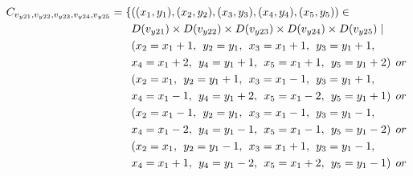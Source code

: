 \begin{align*}
\Cons{y21}{y22}{y23}{y24}{y25}=\{&((x_{1},y_{1}),(x_{2},y_{2}),(x_{3},y_{3}),(x_{4},y_{4}),(x_{5},y_{5}))\in \\
&\Domain {y21} \times \Domain{y22}\times \Domain{y23}\times \Domain{y24}\times \Domain{y25} \mid\\
&(x_{2} = x_{1} + 1,\hspace{1ex}y_{2} = y_{1},\hspace{1ex}x_{3} = x_{1}+1,\hspace{1ex}y_{3} = y_{1}+1,
\\&x_{4} = x_{1}+2,\hspace{1ex}y_{4} = y_{1}+1,\hspace{1ex}x_{5} = x_{1}+1,\hspace{1ex}y_{5} = y_{1}+2)\hspace{1ex} or \\
&(x_{2} = x_{1} ,\hspace{1ex}y_{2} = y_{1}+1,\hspace{1ex}x_{3} = x_{1}-1,\hspace{1ex}y_{3} = y_{1}+1,
\\&x_{4} = x_{1}-1,\hspace{1ex}y_{4} = y_{1}+2,\hspace{1ex}x_{5} = x_{1}-2,\hspace{1ex}y_{5} = y_{1}+1)\hspace{1ex} or \\
&(x_{2} = x_{1}-1 ,\hspace{1ex}y_{2} = y_{1},\hspace{1ex}x_{3} = x_{1}-1,\hspace{1ex}y_{3} = y_{1}-1,
\\&x_{4} = x_{1}-2,\hspace{1ex}y_{4} = y_{1}-1,\hspace{1ex}x_{5} = x_{1}-1,\hspace{1ex}y_{5} = y_{1}-2)\hspace{1ex} or \\
&(x_{2} = x_{1} ,\hspace{1ex}y_{2} = y_{1}-1,\hspace{1ex}x_{3} = x_{1}+1,\hspace{1ex}y_{3} = y_{1}-1,
\\&x_{4} = x_{1}+1,\hspace{1ex}y_{4} = y_{1}-2,\hspace{1ex}x_{5} = x_{1}+2,\hspace{1ex}y_{5} = y_{1}-1)\hspace{1ex} or \\

\end{align*}
